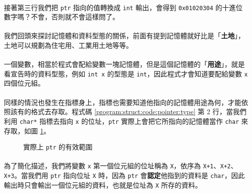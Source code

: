 \documentclass[12pt,a4paper,oneside]{article}
\begin{document}
\begin{CJK}{UTF8}{bkai}
\paragraph{}接著第三行我們把 \lstinline!ptr! 指向的值轉換成 \lstinline!int! 輸出，會得到 \lstinline!0x01020304! 的十進位數字嗎？不會，否則就不會這樣問了。
\paragraph{}我們回頭來探討記憶體和資料型態的關係，前面有提到記憶體就好比是「\textbf{土地}」，土地可以規劃為住宅用、工業用土地等等。
\paragraph{}一個變數，相當於程式會配給變數一塊記憶體，但是這個記憶體的「\textbf{用途}」，就是看宣告時的資料型態，例如 \lstinline!int x! 的型態是 \lstinline!int!，因此程式才會知道要配給變數 \lstinline!x! 四個位元組。
\paragraph{}同樣的情況也發生在指標身上，指標也需要知道他指向的記憶體用途為何，才能依照該有的格式去存取。程式碼 \ref{program:struct:code:pointer:type} 第 2 行，當我們利用 \lstinline!char*! 指標去指向 \lstinline!x! 的位址，\lstinline!ptr! 實際上會把它所指向的記憶體當作 \lstinline!char! 來存取，如圖 \ref{program:struct:fig:pointer:type}。

\begin{figure}[h!]
\centering
{}
\caption{實際上 \lstinline!ptr! 的有效範圍}
\label{program:struct:fig:pointer:type}
\end{figure}

\paragraph{}為了簡化描述，我們將變數 \lstinline!x! 第一個位元組的位址稱為 \texttt{X}，依序為 \texttt{X+1}、\texttt{X+2}、\texttt{X+3}。當我們用 \lstinline!ptr! 指向位址 \lstinline!X! 時，因為 \lstinline!ptr! 會\textbf{認定}他指到的資料是 \lstinline!char!，因此輸出時只會輸出一個位元組的資料，也就是位址為 \lstinline!X! 所存的資料。

\end{CJK}
\end{document}
